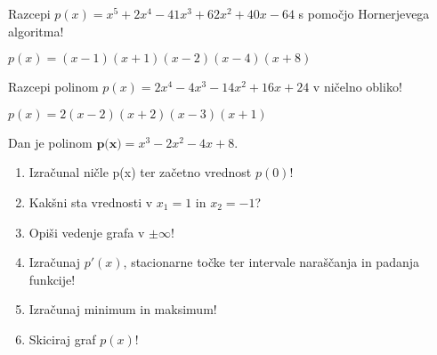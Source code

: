 \begin{vaja}
  Razcepi $p(x)=x^5+2x^4-41x^3+62x^2+40x-64$  s pomočjo Hornerjevega algoritma!


  \begin{odgovor}
    $p(x)=(x-1)(x+1)(x-2)(x-4)(x+8)$
  \end{odgovor}
\end{vaja}

\begin{vaja}
  Razcepi polinom $p(x)=2x^4-4x^3-14x^2+16x+24$  v ničelno obliko!




  \begin{odgovor}
    $p(x)=2(x-2)(x+2)(x-3)(x+1)$
  \end{odgovor}
\end{vaja}

\begin{vaja}
  Dan je polinom $\textbf{p(x)}= x^3-2x^2-4x+8$.
\begin{enumerate}
\item Izračunal ničle p(x) ter začetno vrednost $p(0)$!
\item Kakšni sta vrednosti v $x_1=1$ in $x_2=-1$?
\item Opiši vedenje grafa v $\pm \infty$!
\item Izračunaj $p'(x)$, stacionarne točke ter intervale naraščanja in padanja funkcije!
\item Izračunaj minimum in maksimum!
\item Skiciraj graf $p(x)$!
\end{enumerate}


\end{vaja}
